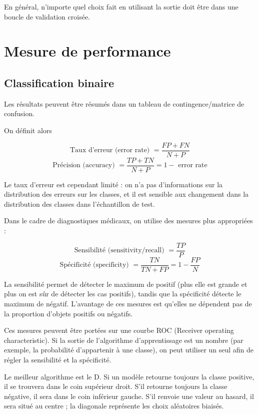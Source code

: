 	En général, n'importe quel choix fait en utilisant la sortie doit être dans une boucle de validation croisée.
	
		
\section{Mesure de performance}

	\subsection{Classification binaire}
	
	Les résultats peuvent être résumés dans un tableau de contingence/matrice de confusion.
	
	
	On définit alors
	
	$$\text{Taux d'erreur (error rate) } = \frac{FP + FN}{N + P}$$
	$$\text{Précision (accuracy) } = \frac{TP + TN}{N + P} = 1 - \text{ error rate}$$
	
	Le taux d'erreur est cependant limité : on n'a pas d'informations sur la distribution des erreurs sur les classes, et il est sensible aux changement dans la distribution des classes dans l'échantillon de test.
	
	
	Dans le cadre de diagnostiques médicaux, on utilise des mesures plus appropriées :
	
	$$\text{Sensibilité (sensitivity/recall) } = \frac{TP}{P}$$
	$$\text{Spécificité (specificity) } = \frac{TN}{TN + FP} = 1 - \frac{FP}{N}$$
	
	La sensibilité permet de détecter le maximum de positif (plus elle est grande et plus on est sûr de détecter les cas positifs), tandis que la spécificité détecte le maximum de négatif. L'avantage de ces mesures est qu'elles ne dépendent pas de la proportion d'objets positifs ou négatifs.
	
	Ces mesures peuvent être portées sur une courbe ROC (Receiver operating characteristic). Si la sortie de l'algorithme d'apprentissage est un nombre (par exemple, la probabilité d'appartenir à une classe), on peut utiliser un seul afin de régler la sensibilité et la spécificité.
	
	
	Le meilleur algorithme est le D. Si un modèle retourne toujours la classe positive, il se trouvera dans le coin supérieur droit. S'il retourne toujours la classe négative, il sera dans le coin inférieur gauche. S'il renvoie une valeur au hasard, il sera situé au centre ; la diagonale représente les choix aléatoires biaisés.
	
